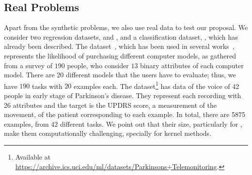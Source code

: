\subsection{Real Problems}


%

%

Apart from the synthetic problems, we also use real data to test our proposal. We consider two regression datasets,  and , and a classification dataset, , which has already been described.
%
The  dataset~\citep{Lenk96}, which has been used in several works~\citep{ArgyriouEP08,AgarwalDG10,KumarD12,JeongJ18}, represents the likelihood of purchasing different computer models, as gathered from a survey of $190$ people, who consider $13$ binary attributes of each computer model. There are $20$ different models that the users have to evaluate; thus, we have $190$ tasks with $20$ examples each.
%
The  dataset\footnote{Available at \url{https://archive.ics.uci.edu/ml/datasets/Parkinsons+Telemonitoring}.} has data of the voice of 42 people in early stage of Parkinson's disease. They represent each recording with 26 attributes and the target is the UPDRS score, a measurement of the movement, of the patient corresponding to each example. 
In total, there are \num{5875} examples, from $42$ different tasks.
%
%
We point out that their size, particularly for , make them computationally challenging, specially for kernel methods.




